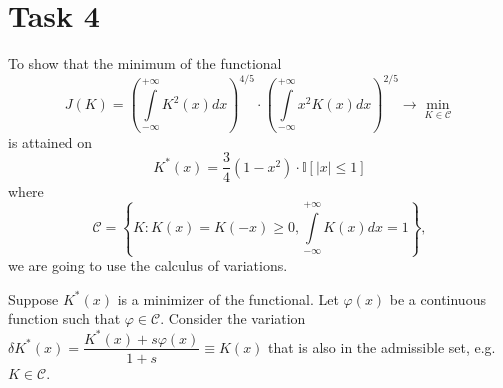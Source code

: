 \documentclass[a4paper, 12pt]{article}
\begin{document}
\section{Task 4}
To show that the minimum of the functional
$$
J(K) = \left( \int \limits_{- \infty}^{+\infty} K^2(x)dx \right)^{4/5} \cdot \left( \int \limits_{- \infty}^{+\infty} x^2 K(x)dx \right)^{2/5} \rightarrow \min \limits_{K \in \mathcal{C}}
$$
is attained on 
$$
K^*(x) = \dfrac{3}{4}(1 - x^2) \cdot \mathbb{I}[|x| \leqslant 1]
$$
where
\begin{equation}
\label{eq1}
\mathcal{C} = \left \{ K : K(x) = K(-x) \geqslant 0, \int \limits_{- \infty}^{+\infty} K(x)dx = 1 \right \},
\end{equation}
we are going to use the calculus of variations. 

Suppose $K^*(x)$ is a minimizer of the functional. Let $\varphi(x)$ be a continuous function such that $\varphi \in \mathcal{C}.$
Consider the variation $ \delta K^*(x) = \dfrac{K^*(x) + s \varphi(x)}{1 + s} \equiv K(x)$ that is also in the admissible set, e.g. $K \in \mathcal{C}.$
\end{document}
